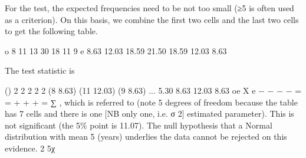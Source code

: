 \documentclass[a4paper,12pt]{article}
\begin{document}
\begin{enumerate}
 
For the test, the expected frequencies need to be not too small (≥5 is often used as a criterion).  On this basis, we combine the first two cells and the last two cells to get the following table. 
 
 
o 8 11 13 30 18 11 9 e 8.63 12.03 18.59 21.50 18.59 12.03 8.63 
 
 
The test statistic is 
 
     
() 2 2 2 2 2 (8 8.63) (11 12.03) (9 8.63) ... 5.30 8.63 12.03 8.63 oe
X
e − − − − = = + + + = ∑ , 
 which is referred to  (note 5 degrees of freedom because the table has 7 cells and there is one [NB only one, i.e. σ 2] estimated parameter).  This is not significant (the 5\% point is 11.07).  The null hypothesis that a Normal distribution with mean 5 (years) underlies the data cannot be rejected on this evidence. 2 5χ
 \end{enumerate}
 
\end{document}
